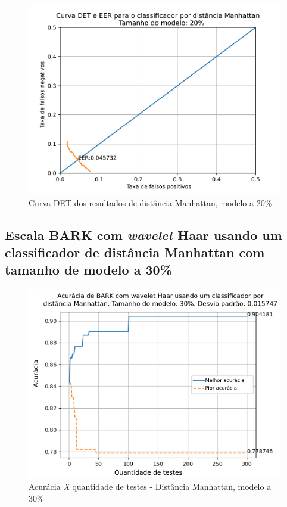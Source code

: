 			\begin{figure}[!h]
				\centering
				\includegraphics[width=.6\linewidth]{images/results/det/DET_for_classifier_Manhattan_20}
				\caption{Curva DET dos resultados de distância Manhattan, modelo a 20\%}
				\label{fig:detforclassifiermanhattan20}
			\end{figure}
	
			\FloatBarrier
		\subsection{Escala BARK com \textit{wavelet} Haar usando um classificador de distância Manhattan com tamanho de modelo a 30\%}
		
			
			
			\begin{figure}[ht]
				\centering
				\includegraphics[width=.6\linewidth]{images/results/confusionMatrices/classifier_Manhattan_30.png}
				\caption{Acurácia \textit{X} quantidade de testes - Distância Manhattan, modelo a 30\%}
				\label{fig:classifiermanhattan30}
			\end{figure}
		
